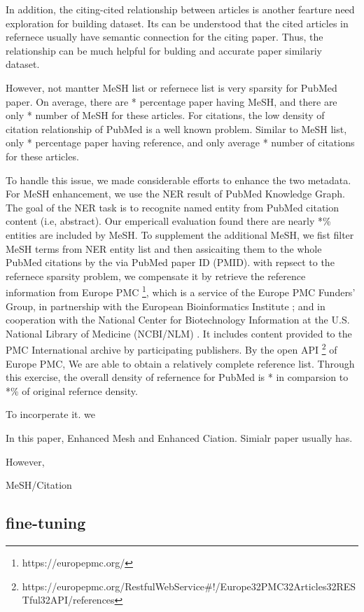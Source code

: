 \documentclass[11pt]{article}
\begin{document}
    In addition, the citing-cited relationship between articles is another fearture need exploration for building dataset. Its can be understood that the cited articles in refernece usually have semantic connection for the citing paper.
    Thus, the relationship can be much helpful for bulding and accurate paper similariy dataset.

    However, not mantter MeSH list or refernece list is very sparsity for PubMed paper. On average, there are * percentage paper having MeSH, and there are only * number of MeSH for these articles.
    For citations, the low density of citation relationship of PubMed is a well known problem. Similar to MeSH list, only * percentage paper having reference, and only average * number of citations for these articles.

    To handle this issue, we made considerable efforts to enhance the two metadata. For MeSH enhancement, we use the NER result of PubMed Knowledge Graph\cite{xu2020building}. The goal of the NER task is to recognite named entity from PubMed citation content (i.e, abstract).
    Our empericall evaluation found there are nearly *\% entities are included by MeSH. To supplement the additional MeSH, we fist filter MeSH terms from NER entity list and then assicaiting them to the whole PubMed citations by the via PubMed paper ID (PMID).
    with repsect to the refernece sparsity problem, we compensate it by retrieve the reference information from Europe PMC \footnote{https://europepmc.org/}, which is a service of the Europe PMC Funders' Group, in partnership with the European Bioinformatics Institute ; and in cooperation with the National Center for Biotechnology Information at the U.S. National Library of Medicine (NCBI/NLM) . It includes content provided to the PMC International archive by participating publishers.
    By the open API \footnote{https://europepmc.org/RestfulWebService#!/Europe32PMC32Articles32RESTful32API/references} of Europe PMC, We are able to obtain a relatively complete reference list. Through this exercise, the overall density of refernence for PubMed is * in comparsion to *\% of original refernce density.

    To incorperate it. we

    In this paper,
    Enhanced Mesh and Enhanced Ciation. Simialr paper usually has.

    However,

    MeSH/Citation


    \subsection{fine-tuning}
\end{document}
